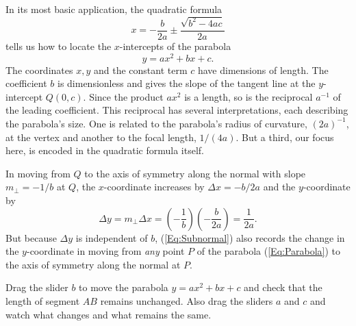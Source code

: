 \documentclass{ximera}
\begin{document}
In its most basic application, the quadratic formula
\[
   x = -\frac{b}{2a}\pm \frac{\sqrt{b^2-4ac}}{2a}
\]
tells us how to locate the $x$-intercepts of the parabola 
\begin{equation}
 y=ax^2+bx+c.   \label{Eq:Parabola}
 \end{equation}
 The coordinates $x,y$ and the constant term $c$ have dimensions of length. The coefficient $b$ is dimensionless and gives the slope of the tangent line at the $y$-intercept $Q(0,c)$. Since the product $ax^2$ is a length, so is the reciprocal $a^{-1}$ of the leading coefficient. This reciprocal has several interpretations, each describing the parabola's size. One is related to the parabola's radius of curvature, $(2a)^{-1}$, at the vertex and another to the focal length, $1/(4a)$. But a third, our focus here, is encoded in the quadratic formula itself.



In moving from $Q$ to the axis of symmetry along the normal with slope $m_\perp = -1/b$ at $Q$, the $x$-coordinate increases by $\Delta x = -b/2a$ and the $y$-coordinate by
\begin{equation}
 \Delta y = m_\perp \Delta x = \left( -\frac{1}{b}\right) \left(- \frac{b}{2a}  \right)= \frac{1}{2a} .  \label{Eq:Subnormal}
\end{equation}
But because $\Delta y$ is independent of $b$, (\ref{Eq:Subnormal}) also records the change in the $y$-coordinate in moving from \emph{any} point $P$ of the parabola (\ref{Eq:Parabola}) to the axis of symmetry along the normal at $P$.

\begin{exploration}\label{exp:cq1}
Drag the slider $b$ to move the parabola $y=ax^2 +bx+c$ and check that the length of segment $AB$ remains unchanged. Also drag the sliders $a$ and $c$ and watch what changes and what remains the same.
 
 
\begin{onlineOnly}
    \begin{center}
\end{center}
\end{onlineOnly}
\end{exploration}
\end{document}
